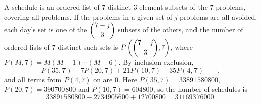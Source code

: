 A schedule is an ordered list of $7$ distinct $3$-element subsets of the $7$ problems, covering all problems. If the problems in a given set of $j$ problems are all avoided, each day's set is one of the $\dbinom{7-j}{3}$ subsets of the others, and the number of ordered lists of $7$ distinct such sets is $P\left(\dbinom{7-j}3,7\right)$, where $P(M,7)=M(M-1)\cdots(M-6)$. By inclusion-exclusion,
\[P(35,7)-7P(20,7)+21P(10,7)-35P(4,7)+\cdots,\]
and all terms from $P(4,7)$ on are $0$. Here $P(35,7)=33891580800$, $P(20,7)=390700800$ and $P(10,7)=604800$, so the number of schedules is
\[33891580800-2734905600+12700800=\boxed{31169376000}.\]
